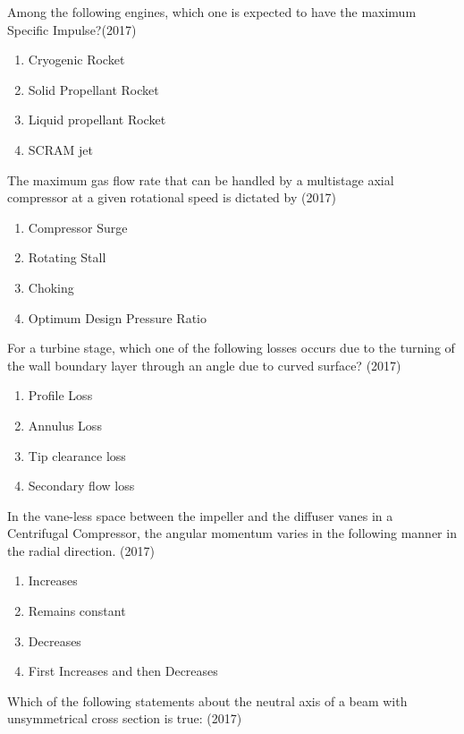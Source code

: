     \item Among the following engines, which one is expected to have the maximum Specific Impulse?\hfill (2017)
    \begin{enumerate}[label=(\Alph*)]
        \item Cryogenic Rocket
        \item Solid Propellant Rocket
        \item Liquid propellant Rocket
        \item SCRAM jet
    \end{enumerate}
    \item The maximum gas flow rate that can be handled by a multistage axial compressor at a given rotational speed is dictated by \hfill (2017)
    \begin{enumerate}[label=(\Alph*)]
        \item Compressor Surge
        \item Rotating Stall
        \item Choking
        \item Optimum Design Pressure Ratio 
    \end{enumerate}
    \item For a turbine stage, which one of the following losses occurs due to the turning of the wall boundary layer through an angle due to curved surface? \hfill (2017)
    \begin{enumerate}[label=(\Alph*)]
        \item Profile Loss 
        \item Annulus Loss 
        \item Tip clearance loss 
        \item Secondary flow loss 
    \end{enumerate}
    \item In the vane-less space between the impeller and the diffuser vanes in a Centrifugal Compressor, the angular momentum varies in the following manner in the radial direction. \hfill (2017)
    \begin{enumerate}[label=(\Alph*)]
        \item Increases
        \item Remains constant
        \item Decreases
        \item First Increases and then Decreases
    \end{enumerate}
    \item Which of the following statements about the neutral axis of a beam with unsymmetrical cross section is true: \hfill (2017)
